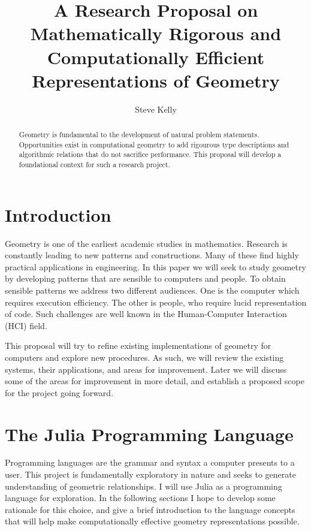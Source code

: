 \documentclass[a4paper]{article}
\title{A Research Proposal on Mathematically Rigorous and Computationally
Efficient Representations of Geometry}
\author{Steve Kelly}
\begin{document}
\maketitle

\begin{abstract}
Geometry is fundamental to the development of natural problem statements.
Opportunities exist in computational geometry to
add rigourous type descriptions and algorithmic relations that do not
sacrifice performance. This proposal will develop a foundational context
for such a research project.
\end{abstract}

\section{Introduction}

Geometry is one of the earliest academic studies in mathematics. Research is
constantly leading to new patterns and constructions. Many of these find
highly practical applications in engineering. In this paper we will seek to
study geometry by developing patterns that are sensible to computers and people.
To obtain sensible patterns we address two different audiences.
One is the computer which requires execution efficiency. The other is people,
who require lucid representation of code. Such challenges are well known in
the Human-Computer Interaction (HCI) field. \cite{Tognazzini_1993}

This proposal will try to refine existing implementations of geometry for
computers and explore new procedures. As such, we will review the existing
systems, their applications, and areas for improvement. Later we will discuss
some of the areas for improvement in more detail, and establish a proposed
scope for the project going forward.

\section{The Julia Programming Language}

Programming languages are the grammar and syntax a computer presents to a user.
This project is fundamentally exploratory in nature and seeks to generate
understanding of geometric relationships. I will use Julia as a programming
language for exploration. In the following sections I hope to develop some
rationale for this choice, and give a brief introduction to the language
concepts that will help make computationally effective geometry representations
possible.
\end{document}
